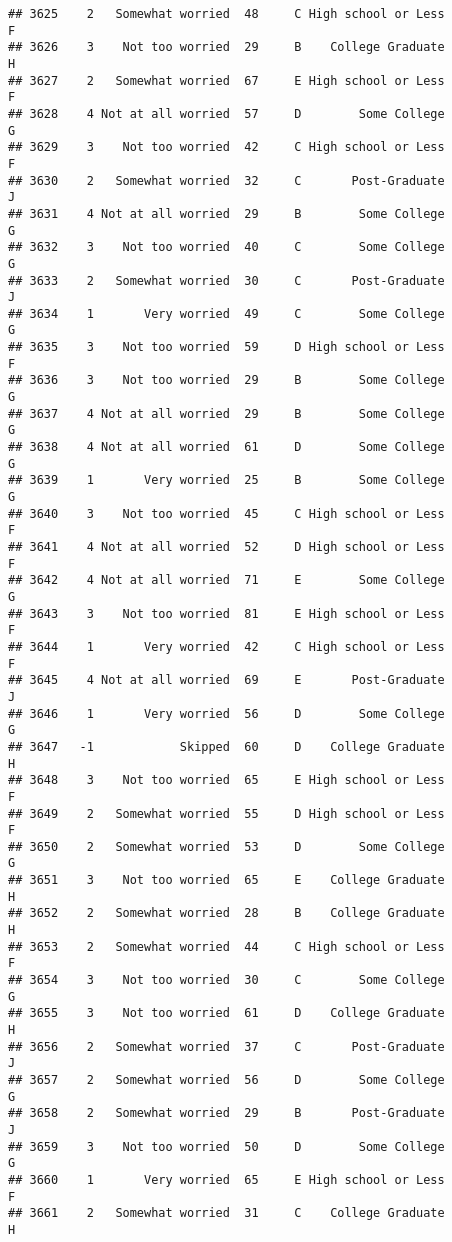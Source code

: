 \documentclass[
]{article}
\begin{document}
\begin{verbatim}
## 3625    2   Somewhat worried  48     C High school or Less         F
## 3626    3    Not too worried  29     B    College Graduate         H
## 3627    2   Somewhat worried  67     E High school or Less         F
## 3628    4 Not at all worried  57     D        Some College         G
## 3629    3    Not too worried  42     C High school or Less         F
## 3630    2   Somewhat worried  32     C       Post-Graduate         J
## 3631    4 Not at all worried  29     B        Some College         G
## 3632    3    Not too worried  40     C        Some College         G
## 3633    2   Somewhat worried  30     C       Post-Graduate         J
## 3634    1       Very worried  49     C        Some College         G
## 3635    3    Not too worried  59     D High school or Less         F
## 3636    3    Not too worried  29     B        Some College         G
## 3637    4 Not at all worried  29     B        Some College         G
## 3638    4 Not at all worried  61     D        Some College         G
## 3639    1       Very worried  25     B        Some College         G
## 3640    3    Not too worried  45     C High school or Less         F
## 3641    4 Not at all worried  52     D High school or Less         F
## 3642    4 Not at all worried  71     E        Some College         G
## 3643    3    Not too worried  81     E High school or Less         F
## 3644    1       Very worried  42     C High school or Less         F
## 3645    4 Not at all worried  69     E       Post-Graduate         J
## 3646    1       Very worried  56     D        Some College         G
## 3647   -1            Skipped  60     D    College Graduate         H
## 3648    3    Not too worried  65     E High school or Less         F
## 3649    2   Somewhat worried  55     D High school or Less         F
## 3650    2   Somewhat worried  53     D        Some College         G
## 3651    3    Not too worried  65     E    College Graduate         H
## 3652    2   Somewhat worried  28     B    College Graduate         H
## 3653    2   Somewhat worried  44     C High school or Less         F
## 3654    3    Not too worried  30     C        Some College         G
## 3655    3    Not too worried  61     D    College Graduate         H
## 3656    2   Somewhat worried  37     C       Post-Graduate         J
## 3657    2   Somewhat worried  56     D        Some College         G
## 3658    2   Somewhat worried  29     B       Post-Graduate         J
## 3659    3    Not too worried  50     D        Some College         G
## 3660    1       Very worried  65     E High school or Less         F
## 3661    2   Somewhat worried  31     C    College Graduate         H

\end{verbatim}
\end{document}
